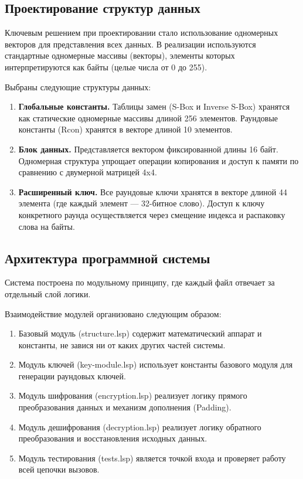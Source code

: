 \subsection{Проектирование структур данных}

Ключевым решением при проектировании стало использование одномерных векторов для представления всех данных. В реализации используются стандартные одномерные массивы (векторы), элементы которых интерпретируются как байты (целые числа от 0 до 255).

Выбраны следующие структуры данных:
\begin{enumerate}
	\item \textbf{Глобальные константы.} Таблицы замен (S-Box и Inverse S-Box) хранятся как статические одномерные массивы длиной 256 элементов. Раундовые константы (Rcon) хранятся в векторе длиной 10 элементов.
	\item \textbf{Блок данных.} Представляется вектором фиксированной длины 16 байт. Одномерная структура упрощает операции копирования и доступ к памяти по сравнению с двумерной матрицей 4x4.
	\item \textbf{Расширенный ключ.} Все раундовые ключи хранятся в векторе длиной 44 элемента (где каждый элемент — 32-битное слово). Доступ к ключу конкретного раунда осуществляется через смещение индекса и распаковку слова на байты.
\end{enumerate}

\subsection{Архитектура программной системы}

Система построена по модульному принципу, где каждый файл отвечает за отдельный слой логики.

Взаимодействие модулей организовано следующим образом:
\begin{enumerate}
	\item Базовый модуль (structure.lsp) содержит математический аппарат и константы, не завися ни от каких других частей системы.
	\item Модуль ключей (key-module.lsp) использует константы базового модуля для генерации раундовых ключей.
	\item Модуль шифрования (encryption.lsp) реализует логику прямого преобразования данных и механизм дополнения (Padding).
	\item Модуль дешифрования (decryption.lsp) реализует логику обратного преобразования и восстановления исходных данных.
	\item Модуль тестирования (tests.lsp) является точкой входа и проверяет работу всей цепочки вызовов.
\end{enumerate}